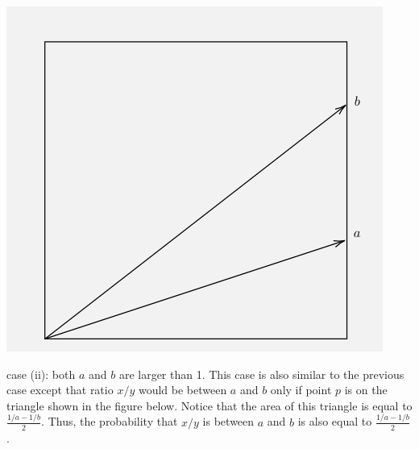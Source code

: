 \begin{solution}
\begin{center}
\includegraphics[width=\textwidth]{83/figs/83_sol.png}
\end{center}
case (ii): both $a$ and $b$ are larger than 1. This case is also similar to the previous case except that ratio $x/y$ would be between $a$ and $b$ only if point $p$ is on the triangle shown in the figure below. Notice that the area of this triangle is equal to $\frac{1/a - 1/b}{2}$. Thus, the probability that $x/y$ is between $a$ and $b$ is also equal to $\frac{1/a - 1/b}{2}$.
\begin{center}

\end{center}
\end{solution}
